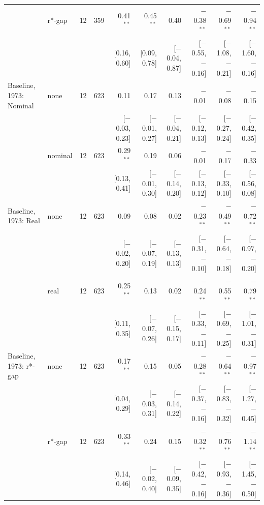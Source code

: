 \begin{table}[tp]
{\begin{tabular}{llcrrrrrrr}
 & r*-gap & 12 & 359 & 0.41$^{**}$ & 0.45$^{**}$ & 0.40 & $-$0.38$^{**}$ & $-$0.69$^{**}$ & $-$0.94$^{**}$\\
 & & & & {\scriptsize [0.16, 0.60]} & {\scriptsize [0.09, 0.78]} & {\scriptsize [$-$0.04, 0.87]} & {\scriptsize [$-$0.55, $-$0.16]} & {\scriptsize [$-$1.08, $-$0.21]} & {\scriptsize [$-$1.60, $-$0.16]}\\
\addlinespace
Baseline, 1973: Nominal & none & 12 & 623 & 0.11 & 0.17 & 0.13 & $-$0.01 & $-$0.08 & $-$0.15\\
 & & & & {\scriptsize [$-$0.03, 0.23]} & {\scriptsize [$-$0.01, 0.27]} & {\scriptsize [$-$0.04, 0.21]} & {\scriptsize [$-$0.12, 0.13]} & {\scriptsize [$-$0.27, 0.24]} & {\scriptsize [$-$0.42, 0.35]}\\
 & nominal & 12 & 623 & 0.29$^{**}$ & 0.19 & 0.06 & $-$0.01 & $-$0.17 & $-$0.33\\
 & & & & {\scriptsize [0.13, 0.41]} & {\scriptsize [$-$0.01, 0.30]} & {\scriptsize [$-$0.14, 0.20]} & {\scriptsize [$-$0.13, 0.12]} & {\scriptsize [$-$0.33, 0.10]} & {\scriptsize [$-$0.56, 0.08]}\\
\addlinespace
Baseline, 1973: Real & none & 12 & 623 & 0.09 & 0.08 & 0.02 & $-$0.23$^{**}$ & $-$0.49$^{**}$ & $-$0.72$^{**}$\\
 & & & & {\scriptsize [$-$0.02, 0.20]} & {\scriptsize [$-$0.07, 0.19]} & {\scriptsize [$-$0.13, 0.13]} & {\scriptsize [$-$0.31, $-$0.10]} & {\scriptsize [$-$0.64, $-$0.18]} & {\scriptsize [$-$0.97, $-$0.20]}\\
 & real & 12 & 623 & 0.25$^{**}$ & 0.13 & 0.02 & $-$0.24$^{**}$ & $-$0.55$^{**}$ & $-$0.79$^{**}$\\
 & & & & {\scriptsize [0.11, 0.35]} & {\scriptsize [$-$0.07, 0.26]} & {\scriptsize [$-$0.15, 0.17]} & {\scriptsize [$-$0.33, $-$0.11]} & {\scriptsize [$-$0.69, $-$0.25]} & {\scriptsize [$-$1.01, $-$0.31]}\\
\addlinespace
Baseline, 1973: r*-gap & none & 12 & 623 & 0.17$^{**}$ & 0.15 & 0.05 & $-$0.28$^{**}$ & $-$0.64$^{**}$ & $-$0.97$^{**}$\\
 & & & & {\scriptsize [0.04, 0.29]} & {\scriptsize [$-$0.03, 0.31]} & {\scriptsize [$-$0.14, 0.22]} & {\scriptsize [$-$0.37, $-$0.16]} & {\scriptsize [$-$0.83, $-$0.32]} & {\scriptsize [$-$1.27, $-$0.45]}\\
 & r*-gap & 12 & 623 & 0.33$^{**}$ & 0.24 & 0.15 & $-$0.32$^{**}$ & $-$0.76$^{**}$ & $-$1.14$^{**}$\\
 & & & & {\scriptsize [0.14, 0.46]} & {\scriptsize [$-$0.02, 0.40]} & {\scriptsize [$-$0.09, 0.35]} & {\scriptsize [$-$0.42, $-$0.16]} & {\scriptsize [$-$0.93, $-$0.36]} & {\scriptsize [$-$1.45, $-$0.50]}\\

\end{tabular}}
\end{table}
